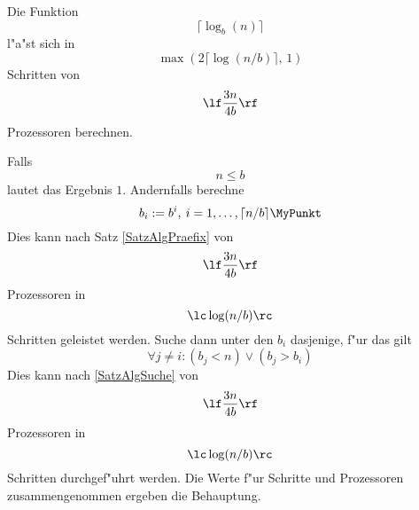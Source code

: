 \begin{satz}
\label{SatzAlgLog}
    Die Funktion
    \[ \lceil \log_b(n) \rceil \] l"a"st sich in
    \[ \max(2\lceil \log(n/b) \rceil, \, 1) \] Schritten von
    \[ \lf \frac{3n}{4b} \rf \] Prozessoren berechnen.
\end{satz}
\begin{beweis}
    Falls \[ n \leq b \] lautet das Ergebnis $1$.
    Andernfalls berechne 
    \[ b_i := b^i , \: i = 1, \ldots, \lceil n/b \rceil  \MyPunkt\]
    Dies kann nach Satz \ref{SatzAlgPraefix}
    von \[ \lf \frac{3n}{4b} \rf \] Prozessoren
    in \[ \lc \log(n/b) \rc \] Schritten geleistet werden.
    Suche dann unter den $b_i$
    dasjenige, f"ur das gilt
    \[ \forall j\neq i: (b_j < n) \vee (b_j > b_i) \]
    Dies kann nach \ref{SatzAlgSuche} von
    \[ \lf \frac{3n}{4b} \rf \] Prozessoren in
    \[ \lc \log(n/b) \rc \] Schritten durchgef"uhrt werden.
    Die Werte f"ur Schritte und
    Prozessoren zusammengenommen ergeben die Behauptung. 
    \mbox{\hspace{10em} \hfill}
\end{beweis}

